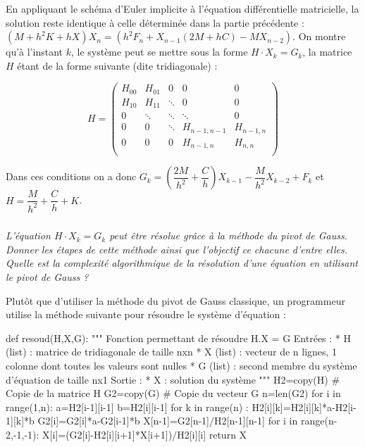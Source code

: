 \documentclass[10pt]{article}
\newif\ifprof
\begin{document}
En appliquant le schéma d'Euler implicite à l'équation différentielle matricielle, la solution reste identique à celle déterminée dans la partie précédente : $\left(M +h^2K+hX\right)X_{n}= \left(h^2F_n +X_{n-1}(2M+hC) -MX_{n-2} \right)$. On montre qu'à l'instant $k$, le système peut se mettre sous la forme $H\cdot X_k = G_k$, la matrice $H$ étant de la forme suivante (dite tridiagonale) :
\begin{minipage}[c]{.4\linewidth}
$$
H =
\begin{pmatrix}
H_{00}  & H_{01} &  0 & 0 & 0 \\
H_{10}  & H_{11} &  \ddots & 0 & 0 \\
0 & \ddots & \ddots & \ddots & 0 \\
0 & 0 & \ddots & H_{n-1,n-1} & H_{n-1,n} \\
0 & 0 & 0 & H_{n-1,n} & H_{n,n} \\
\end{pmatrix}
 $$
 \end{minipage} \hfill
\begin{minipage}[c]{.57\linewidth}
\begin{rem}
Dans ces conditions on a donc  $G_k = \left(\dfrac{2M}{h^2}+\dfrac{C}{h} \right)X_{k-1} - \dfrac{M}{h^2} X_{k-2} + F_k $ et $H = \dfrac{M}{h^2} + \dfrac{C}{h} + K$.
\end{rem}
 \end{minipage} 

\fi

\subparagraph{}
\textit{L'équation  $H\cdot X_k = G_k$ peut être résolue grâce à la méthode du pivot de Gauss. Donner les étapes de cette méthode ainsi que l'objectif ce chacune d'entre elles. Quelle est la complexité algorithmique de la résolution d'une équation en utilisant le pivot de Gauss ?}
\ifprof
\begin{corrige}
Voir cours. Complexité cubique.
\end{corrige}
\else
\fi

\ifprof
\else

Plutôt que d'utiliser la méthode du pivot de Gauss classique, un programmeur utilise la méthode suivante pour résoudre le système d'équation : 
\begin{py}
\begin{python}
def resoud(H,X,G):
    """
    Fonction permettant de résoudre H.X = G
    Entrées : 
        * H (list) : matrice de tridiagonale de taille nxn
        * X (list) : vecteur de n lignes, 1 colonne dont toutes les valeurs sont nulles
        * G (list) : second membre du système d'équation de taille nx1
    Sortie : 
        * X : solution du système
    """
    H2=copy(H)  # Copie de la matrice H
    G2=copy(G)  # Copie du vecteur G
    n=len(G2)
    for i in range(1,n):
        a=H2[i-1][i-1]
        b=H2[i][i-1]
        for k in range(n) :
            H2[i][k]=H2[i][k]*a-H2[i-1][k]*b
        G2[i]=G2[i]*a-G2[i-1]*b
    X[n-1]=G2[n-1]/H2[n-1][n-1]
    for i in range(n-2,-1,-1):
        X[i]=(G2[i]-H2[i][i+1]*X[i+1])/H2[i][i]
    return X

\end{python}
\end{py}
\end{document}

